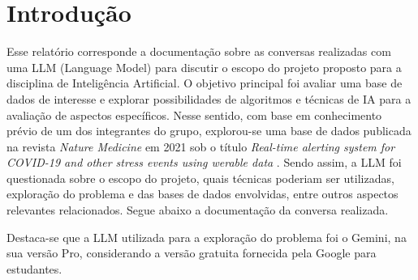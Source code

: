 \section{Introdução}

Esse relatório corresponde a documentação sobre as conversas realizadas com uma LLM (Language Model) para discutir o escopo do projeto proposto para a disciplina de Inteligência Artificial. O objetivo principal foi avaliar uma base de dados de interesse e explorar possibilidades de algoritmos e técnicas de IA para a avaliação de aspectos específicos. Nesse sentido, com base em conhecimento prévio de um dos integrantes do grupo, explorou-se uma base de dados publicada na revista \textit{Nature Medicine} em 2021 sob o título \textit{Real-time alerting system for COVID-19 and other stress events using werable data} \cite{nature}. Sendo assim, a LLM foi questionada sobre o escopo do projeto, quais técnicas poderiam ser utilizadas, exploração do problema e das bases de dados envolvidas, entre outros aspectos relevantes relacionados. Segue abaixo a documentação da conversa realizada.

Destaca-se que a LLM utilizada para a exploração do problema foi o Gemini, na sua versão Pro, considerando a versão gratuita fornecida pela Google para estudantes.
